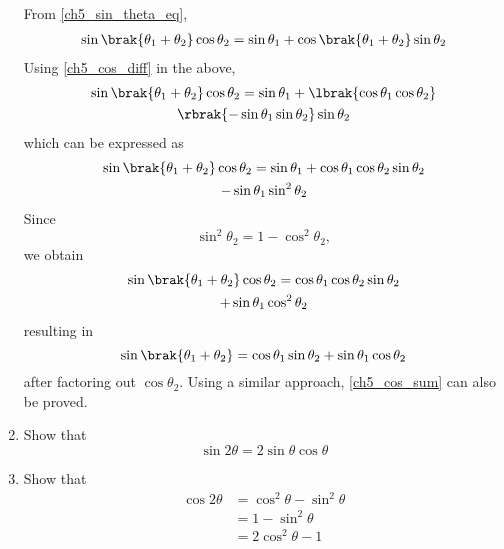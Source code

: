 \begin{enumerate}[label=\arabic*.,ref=\thesubsection.\theenumi]
%
\solution From \eqref{ch5_sin_theta_eq},
%
\begin{align}
 \sin \brak{\theta_1 + \theta_2}\cos \theta_2 =\sin  \theta_1 +\cos\brak{\theta_1+\theta_2}\sin\theta_2 
\end{align}
%
Using \eqref{ch5_cos_diff} in the above,
%
\begin{multline}
\sin \brak{\theta_1 + \theta_2}\cos \theta_2 
=\sin  \theta_1 +\lbrak{\cos \theta_1\cos\theta_2 }
\\	
\rbrak{	- \sin \theta_1\sin\theta_2}\sin\theta_2 
\end{multline}
%
which can be expressed as
%
\begin{multline}
\sin \brak{\theta_1 + \theta_2}\cos \theta_2 
=\sin  \theta_1 +\cos \theta_1\cos\theta_2 \sin\theta_2 
\\	
	- \sin \theta_1\sin^2\theta_2
\end{multline}
%
Since
%
\begin{equation}
\sin^2\theta_2 = 1- \cos^2\theta_2, 
\end{equation}
%
we obtain
%
\begin{multline}
\sin \brak{\theta_1 + \theta_2}\cos \theta_2 
=\cos \theta_1\cos\theta_2 \sin\theta_2 
\\	
+ \sin \theta_1\cos^2\theta_2
\end{multline}
%
resulting in
%
\begin{equation}
\sin \brak{\theta_1 + \theta_2}
=\cos \theta_1 \sin\theta_2 
+ \sin \theta_1\cos\theta_2
\end{equation}
%
after factoring out $\cos \theta_2$.  Using a similar approach, \eqref{ch5_cos_sum} can also be proved.
%
\item
	Show that
	\begin{equation}
	\label{eq:sin2theta}
	\sin 2\theta = 2 \sin\theta \cos\theta
	\end{equation}
%
\item
	Show that
	\begin{align}
	\label{eq:cos2theta_cos_sin}
	\cos 2\theta &= \cos^2\theta -\sin^2\theta 
\\
	\label{eq:cos2theta_sin_sq}
&= 1 - \sin^2\theta
\\
&=2\cos^2\theta -1
	\label{eq:cos2theta_cos_sq}
	\end{align}

\end{enumerate}

